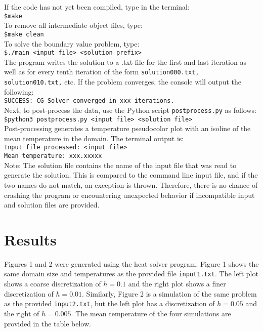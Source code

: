 \documentclass[12pt]{article}
\begin{document}
\noindent
If the code has not yet been compiled, type in the terminal:\\
\texttt{\$make} \vspace{0.01in}\\

\noindent
To remove all intermediate object files, type:\\
\texttt{\$make clean} \vspace{0.01in}\\

\noindent
To solve the boundary value problem, type: \\
\texttt{\$./main <input file> <solution prefix>} \vspace{0.01in}\\

\noindent
The program writes the solution to a .txt file for the first and last iteration as well as for every tenth iteration of the form \texttt{solution000.txt, solution010.txt,} etc. If the problem converges, the console will output the following: \\
\texttt{SUCCESS: CG Solver converged in xxx iterations.} \vspace{0.01in}\\

\noindent
Next, to post-process the data, use the Python script \texttt{postprocess.py} as follows: \\
\texttt{\$python3 postprocess.py <input file> <solution file>} \vspace{0.1in}\\
Post-processing generates a temperature pseudocolor plot with an isoline of the mean temperature in the domain. The terminal output is:\\
\texttt{Input file processed: <input file>}\\
\texttt{Mean temperature: xxx.xxxxx} \vspace{0.01in}\\

\noindent
Note: The solution file contains the name of the input file that was read to generate the solution. This is compared to the command line input file, and if the two names do not match, an exception is thrown. Therefore, there is no chance of crashing the program or encountering unexpected behavior if incompatible input and solution files are provided. 

\section{Results}
Figures 1 and 2 were generated using the heat solver program. Figure 1 shows the same domain size and temperatures as the provided file \texttt{input1.txt}. The left plot shows a coarse discretization of $h=0.1$ and the right plot shows a finer discretization of $h=0.01$. Similarly, Figure 2 is a simulation of the same problem as the provided \texttt{input2.txt}, but the left plot has a discretization of $h=0.05$ and the right of $h=0.005$. The mean temperature of the four simulations are provided in the table below.
\end{document}
